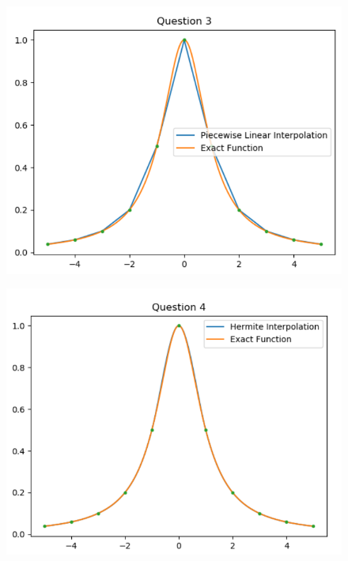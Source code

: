 \begin{figure}[h]
	\centering
	\includegraphics[scale=.5]{../fig/q3.png}
\end{figure}
\begin{figure}[h]
	\centering
	\includegraphics[scale=.45]{../fig/q4.png}
\end{figure}
